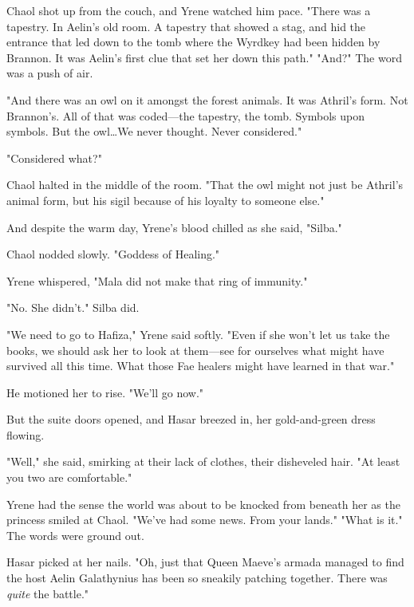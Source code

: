 Chaol shot up from the couch, and Yrene watched him pace.
"There was a tapestry.
In Aelin's old room.
A tapestry that showed a stag, and hid the entrance that led down to the tomb where the Wyrdkey had been hidden by Brannon.
It was Aelin's first clue that set her down this path."
"And?"
The word was a push of air.

"And there was an owl on it amongst the forest animals.
It was Athril's form.
Not Brannon's.
All of that was coded---the tapestry, the tomb.
Symbols upon symbols.
But the owl\ldots We never thought.
Never considered."

"Considered what?"

Chaol halted in the middle of the room.
"That the owl might not just be Athril's animal form, but his sigil because of his loyalty to someone else."

And despite the warm day, Yrene's blood chilled as she said, "Silba."

Chaol nodded slowly.
"Goddess of Healing."

Yrene whispered, "Mala did not make that ring of immunity."

"No.
She didn't."
Silba did.

"We need to go to Hafiza," Yrene said softly.
"Even if she won't let us take the books, we should ask her to look at them---see for ourselves what might have survived all this time.
What those Fae healers might have learned in that war."

He motioned her to rise.
"We'll go now."

But the suite doors opened, and Hasar breezed in, her gold-and-green dress flowing.

"Well," she said, smirking at their lack of clothes, their disheveled hair.
"At least you two are comfortable."

Yrene had the sense the world was about to be knocked from beneath her as the princess smiled at Chaol.
"We've had some news.
From your lands."
"What is it."
The words were ground out.

Hasar picked at her nails.
"Oh, just that Queen Maeve's armada managed to find the host Aelin Galathynius has been so sneakily patching together.
There was \emph{quite} the battle."

